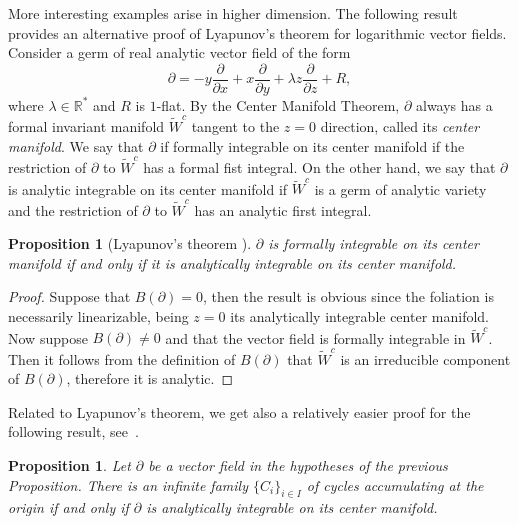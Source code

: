 \documentclass[10pt,twoside,reqno]{amsart}
\newtheorem{prop}[thm]{Proposition}
\newtheorem{proposition}[thm]{Proposition}
\theoremstyle{remark}
\theoremstyle{remark}
\newcommand{\R}{\mathbb{R}}
\newcommand{\xx}{\frac{\partial}{\partial x}}
\newcommand{\yy}{\frac{\partial}{\partial y}}
\newcommand{\zz}{\frac{\partial}{\partial z}}
\begin{document}
More interesting examples arise in higher dimension.
The following result provides an alternative proof of Lyapunov's theorem for logarithmic vector fields. 
Consider a germ of real analytic vector field of the form 
$$\partial = -y\xx + x\yy + \lambda z\zz + R,$$
where $\lambda \in \R^\ast$ and $R$ is $1$-flat. By the Center Manifold Theorem, $\partial$ always has a formal invariant manifold $\widetilde{W}^c$ tangent to the $z=0$ direction, called its {\em center manifold}. We say that $\partial$ if formally integrable on its center manifold if the restriction of $\partial$ to $\widetilde{W}^c$ has a formal fist integral. On the other hand, we say that $\partial$ is analytic integrable on its center manifold if $\widetilde{W}^c$ is a germ of analytic variety and the restriction of $\partial$ to $\widetilde{W}^c$ has an analytic first integral. 
\begin{proposition}[Lyapunov's theorem \cite{Lyapunov}] \label{prop:lyapunov}
    $\partial$
is formally integrable on its center manifold if and only if it is analytically integrable on its center manifold.
\end{proposition}
\noindent 
\begin{proof}
   Suppose that $B(\partial)=0$, then the result is obvious since the foliation is necessarily linearizable, being $z=0$ its analytically integrable center manifold. Now suppose $B(\partial)\neq 0$ and that the vector field is formally integrable in $\widetilde
   {W}^c$. Then it follows from the definition of $B(\partial)$ that $\widetilde{W}^c$ is an irreducible component of $B(\partial)$, therefore it is analytic.
   
   
  
\end{proof}
Related to Lyapunov's theorem, we get also a relatively easier proof for the following result, see~\cite{Aulbach1985,Corral2025,Kelley1967}.
\begin{prop}
    Let $\partial$ be a vector field in the hypotheses of the previous Proposition. There is an infinite family $\{C_i\}_{i\in I}$ of cycles accumulating at the origin if and only if $\partial$ is analytically integrable on its center manifold.
\end{prop}
\end{document}
